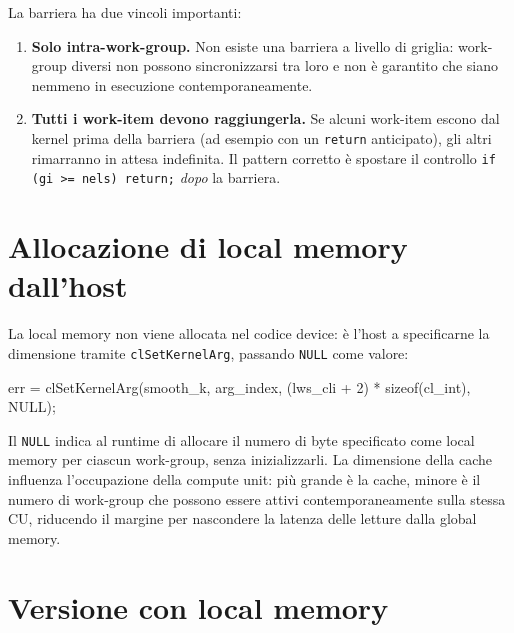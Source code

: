 La barriera ha due vincoli importanti:

\begin{enumerate}
    \item \textbf{Solo intra-work-group.} Non esiste una barriera a livello di griglia: work-group diversi non possono sincronizzarsi tra loro e non è garantito che siano nemmeno in esecuzione contemporaneamente.

    \item \textbf{Tutti i work-item devono raggiungerla.} Se alcuni work-item escono dal kernel prima della barriera (ad esempio con un \texttt{return} anticipato), gli altri rimarranno in attesa indefinita. Il pattern corretto è spostare il controllo \texttt{if (gi >= nels) return;} \emph{dopo} la barriera.
\end{enumerate}

\section{Allocazione di local memory dall'host}\label{sec:opencl_lmem_alloc}

La local memory non viene allocata nel codice device: è l'host a specificarne la dimensione tramite \texttt{clSetKernelArg}, passando \texttt{NULL} come valore:

\begin{code}[caption={Allocazione di local memory dall'host}, label={code:lmem_host_alloc}]
err = clSetKernelArg(smooth_k, arg_index,
                     (lws_cli + 2) * sizeof(cl_int), NULL);
\end{code}

Il \texttt{NULL} indica al runtime di allocare il numero di byte specificato come local memory per ciascun work-group, senza inizializzarli. La dimensione della cache influenza l'occupazione della compute unit: più grande è la cache, minore è il numero di work-group che possono essere attivi contemporaneamente sulla stessa CU, riducendo il margine per nascondere la latenza delle letture dalla global memory.

\section{Versione con local memory}\label{sec:opencl_lmem_smooth_lmem}

